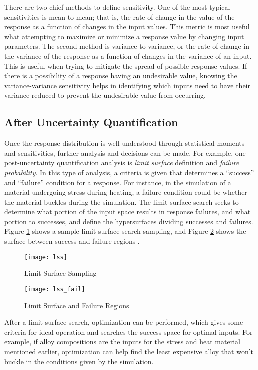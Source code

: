 There are two chief methods to define sensitivity.  One of the most typical sensitivities
is mean to mean; that is, the rate of change in the value of the response as a function of changes in the
input values.  This metric is most useful what attempting to maximize or minimize a response value by changing
input parameters.  The second method is variance to variance, or the rate of change in the variance of the
response as a function of changes in the variance of an input.  This is useful when trying to mitigate the
spread of possible response values.  If there is a possibility of a response having an undesirable value,
knowing the variance-variance sensitivity helps in identifying which inputs need to have their variance
reduced to prevent the undesirable value from occurring.

\subsection{After Uncertainty Quantification}
Once the response distribution is well-understood through statistical moments and sensitivities, 
further analysis
and decisions can be made.  For example, one post-uncertainty quantification analysis is \emph{limit
surface} definition and \emph{failure probability}.  In this type of analysis, a criteria is given that determines
a ``success'' and ``failure'' condition for a response.  For instance, in the simulation of a
material undergoing stress during heating, a failure condition could be whether the material
buckles during the simulation.  The limit surface search seeks to determine what portion of the
input space results in response failures, and what portion to successes, and define the hypersurfaces dividing
successes and failures.  Figure \ref{fig:lss} shows a sample limit surface search sampling, and Figure
\ref{fig:lss fail} shows the surface between success and failure regions \cite{raven}.  

\begin{figure}[htb]
  \centering
  \texttt{[image: lss]}
  \caption{Limit Surface Sampling \cite{raven}}
  \label{fig:lss}
\end{figure}
\begin{figure}[htb]
  \centering
  \texttt{[image: lss\_fail]}
  \caption{Limit Surface and Failure Regions \cite{raven}}
  \label{fig:lss fail}
\end{figure}

After a limit surface search, optimization can be performed, which gives
some criteria for ideal operation and searches the success space for optimal inputs.  For example,
if alloy compositions are the inputs for the stress and heat material mentioned earlier, optimization
can help find the least expensive alloy that won't buckle in the conditions given by the simulation.

